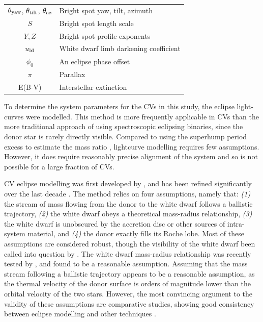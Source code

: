 \begin{table}
\begin{tabular}{cl}
        $\theta_{\rm yaw}$, $\theta_{\rm tilt}$, $\theta_{\rm az}$      & Bright spot yaw, tilt, azimuth                          \\
        $S$                                                             & Bright spot length scale                                \\
        $Y, Z$                                                          & Bright spot profile exponents                           \\
        $u_{\rm ld}$                                                    & White dwarf limb darkening coefficient                  \\
        $\phi_0$                                                        & An eclipse phase offset                                 \\
        $\pi$                                                           & Parallax                                                \\
        E(B-V)                                                          & Interstellar extinction   \\

        \hline
    \end{tabular}
\end{table}

To determine the system parameters for the CVs in this study, the eclipse light-curves were modelled. This method is more frequently applicable in CVs than the more traditional approach of using spectroscopic eclipsing binaries, since the donor star is rarely directly visible. Compared to using the superhump period excess to estimate the mass ratio \citep{patterson2005, knigge2006}, lightcurve modelling requires few assumptions. However, it does require reasonably precise alignment of the system and so is not possible for a large fraction of CVs.

CV eclipse modelling was first developed by \citet{wood1986}, and has been refined significantly over the last decade \citep{Savoury2011, littlefair2014, mcallister2017, McAllister2019}. The method relies on four assumptions, namely that: \textit{(1)} the stream of mass flowing from the donor to the white dwarf follows a ballistic trajectory, \textit{(2)} the white dwarf obeys a theoretical mass-radius relationship, \textit{(3)} the white dwarf is unobscured by the accretion disc or other sources of intra-system material, and \textit{(4)} the donor exactly fills its Roche lobe.
Most of these assumptions are considered robust, though the visibility of the white dwarf been called into question by \citet{Spark2015}.
The white dwarf mass-radius relationship was recently tested by \citet{parsons2017}, and found to be a reasonable assumption.
Assuming that the mass stream following a ballistic trajectory appears to be a reasonable assumption, as the thermal velocity of the donor surface is orders of magnitude lower than the orbital velocity of the two stars.
However, the most convincing argument to the validity of these assumptions are comparative studies, showing good consistency between eclipse modelling and other techniques \citep{tulloch2009,copperwheat2012,savoury2012,sion2022}.

